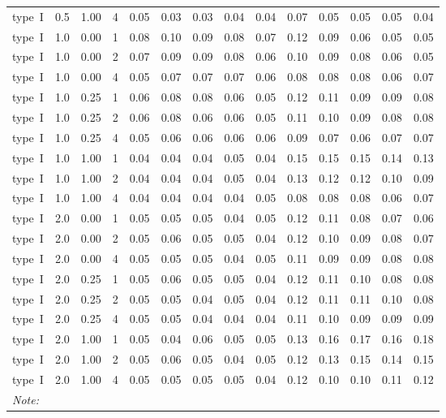 \begin{table}
\begin{tabular}[t]{lrrrrrrrrrrrrr}
type~I & 0.5 & 1.00 & 4 & 0.05 & 0.03 & 0.03 & 0.04 & 0.04 & 0.07 & 0.05 & 0.05 & 0.05 & 0.04\\
type~I & 1.0 & 0.00 & 1 & 0.08 & 0.10 & 0.09 & 0.08 & 0.07 & 0.12 & 0.09 & 0.06 & 0.05 & 0.05\\
type~I & 1.0 & 0.00 & 2 & 0.07 & 0.09 & 0.09 & 0.08 & 0.06 & 0.10 & 0.09 & 0.08 & 0.06 & 0.05\\
type~I & 1.0 & 0.00 & 4 & 0.05 & 0.07 & 0.07 & 0.07 & 0.06 & 0.08 & 0.08 & 0.08 & 0.06 & 0.07\\
type~I & 1.0 & 0.25 & 1 & 0.06 & 0.08 & 0.08 & 0.06 & 0.05 & 0.12 & 0.11 & 0.09 & 0.09 & 0.08\\
type~I & 1.0 & 0.25 & 2 & 0.06 & 0.08 & 0.06 & 0.06 & 0.05 & 0.11 & 0.10 & 0.09 & 0.08 & 0.08\\
type~I & 1.0 & 0.25 & 4 & 0.05 & 0.06 & 0.06 & 0.06 & 0.06 & 0.09 & 0.07 & 0.06 & 0.07 & 0.07\\
type~I & 1.0 & 1.00 & 1 & 0.04 & 0.04 & 0.04 & 0.05 & 0.04 & 0.15 & 0.15 & 0.15 & 0.14 & 0.13\\
type~I & 1.0 & 1.00 & 2 & 0.04 & 0.04 & 0.04 & 0.05 & 0.04 & 0.13 & 0.12 & 0.12 & 0.10 & 0.09\\
type~I & 1.0 & 1.00 & 4 & 0.04 & 0.04 & 0.04 & 0.04 & 0.05 & 0.08 & 0.08 & 0.08 & 0.06 & 0.07\\
type~I & 2.0 & 0.00 & 1 & 0.05 & 0.05 & 0.05 & 0.04 & 0.05 & 0.12 & 0.11 & 0.08 & 0.07 & 0.06\\
type~I & 2.0 & 0.00 & 2 & 0.05 & 0.06 & 0.05 & 0.05 & 0.04 & 0.12 & 0.10 & 0.09 & 0.08 & 0.07\\
type~I & 2.0 & 0.00 & 4 & 0.05 & 0.05 & 0.05 & 0.04 & 0.05 & 0.11 & 0.09 & 0.09 & 0.08 & 0.08\\
type~I & 2.0 & 0.25 & 1 & 0.05 & 0.06 & 0.05 & 0.05 & 0.04 & 0.12 & 0.11 & 0.10 & 0.08 & 0.08\\
type~I & 2.0 & 0.25 & 2 & 0.05 & 0.05 & 0.04 & 0.05 & 0.04 & 0.12 & 0.11 & 0.11 & 0.10 & 0.08\\
type~I & 2.0 & 0.25 & 4 & 0.05 & 0.05 & 0.04 & 0.04 & 0.04 & 0.11 & 0.10 & 0.09 & 0.09 & 0.09\\
type~I & 2.0 & 1.00 & 1 & 0.05 & 0.04 & 0.06 & 0.05 & 0.05 & 0.13 & 0.16 & 0.17 & 0.16 & 0.18\\
type~I & 2.0 & 1.00 & 2 & 0.05 & 0.06 & 0.05 & 0.04 & 0.05 & 0.12 & 0.13 & 0.15 & 0.14 & 0.15\\
type~I & 2.0 & 1.00 & 4 & 0.05 & 0.05 & 0.05 & 0.05 & 0.04 & 0.12 & 0.10 & 0.10 & 0.11 & 0.12\\
\bottomrule
\multicolumn{14}{l}{\textit{Note: }}\\

\end{tabular}
\end{table}
